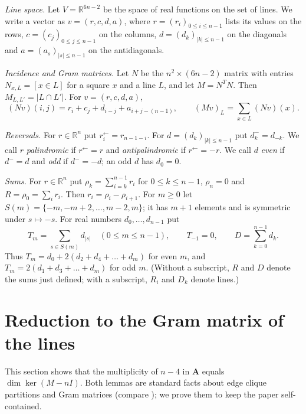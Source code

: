 \documentclass[11pt]{amsart}
\theoremstyle{plain}
\theoremstyle{definition}
\theoremstyle{remark}
\numberwithin{equation}{section}
\newcommand{\Adj}{\mathbf{A}}          %
\newcommand{\R}{\mathbb{R}}
\newcommand{\iv}[1]{[#1]}              %
\newcommand{\abs}[1]{\lvert #1\rvert}
\newcommand{\rev}[1]{#1^{\leftarrow}}  %
\newcommand{\refl}[1]{#1^{-}}          %
\begin{document}
\emph{Line space.} Let \(V=\R^{6n-2}\) be the space of real functions on the set of
lines. We write a vector as \(v=(r,c,d,a)\), where \(r=(r_i)_{0\le i\le n-1}\) lists its
values on the rows, \(c=(c_j)_{0\le j\le n-1}\) on the columns,
\(d=(d_k)_{\abs{k}\le n-1}\) on the diagonals and \(a=(a_s)_{\abs{s}\le n-1}\) on the
antidiagonals.

\emph{Incidence and Gram matrices.} Let \(N\) be the \(n^2\times(6n-2)\) matrix with
entries \(N_{x,L}=\iv{x\in L}\) for a square \(x\) and a line \(L\), and let
\(M=N^{T}N\). Then \(M_{L,L'}=\abs{L\cap L'}\). For \(v=(r,c,d,a)\),
\begin{equation}\label{eq:Nv}
(Nv)(i,j)=r_i+c_j+d_{i-j}+a_{i+j-(n-1)},\qquad (Mv)_L=\sum_{x\in L}(Nv)(x).
\end{equation}

\emph{Reversals.} For \(r\in\R^n\) put \(\rev{r}_i=r_{n-1-i}\). For
\(d=(d_k)_{\abs{k}\le n-1}\) put \(\refl{d}_k=d_{-k}\). We call \(r\)
\emph{palindromic} if \(\rev{r}=r\) and \emph{antipalindromic} if \(\rev{r}=-r\). We call
\(d\) \emph{even} if \(\refl{d}=d\) and \emph{odd} if \(\refl{d}=-d\); an odd \(d\) has
\(d_0=0\).

\emph{Sums.} For \(r\in\R^n\) put \(\rho_k=\sum_{i=k}^{n-1}r_i\) for \(0\le k\le n-1\),
\(\rho_n=0\) and \(R=\rho_0=\sum_i r_i\). Then \(r_i=\rho_i-\rho_{i+1}\). For \(m\ge0\) let
\(S(m)=\{-m,-m+2,\dots,m-2,m\}\); it has \(m+1\) elements and is symmetric under
\(s\mapsto -s\). For real numbers \(d_0,\dots,d_{n-1}\) put
\begin{equation}\label{eq:T}
T_m=\sum_{s\in S(m)}d_{\abs{s}}\quad(0\le m\le n-1),\qquad T_{-1}=0,\qquad
D=\sum_{k=0}^{n-1}d_k.
\end{equation}
Thus \(T_m=d_0+2(d_2+d_4+\dots+d_m)\) for even \(m\), and \(T_m=2(d_1+d_3+\dots+d_m)\) for
odd \(m\). (Without a subscript, \(R\) and \(D\) denote the sums just defined; with a
subscript, \(R_i\) and \(D_k\) denote lines.)

\section{Reduction to the Gram matrix of the lines}\label{sec:reduction}

This section shows that the multiplicity of \(n-4\) in \(\Adj\) equals
\(\dim\ker(M-nI)\). Both lemmas are standard facts about edge clique partitions and Gram
matrices (compare \cite{CCD22}); we prove them to keep the paper self-contained.
\end{document}
